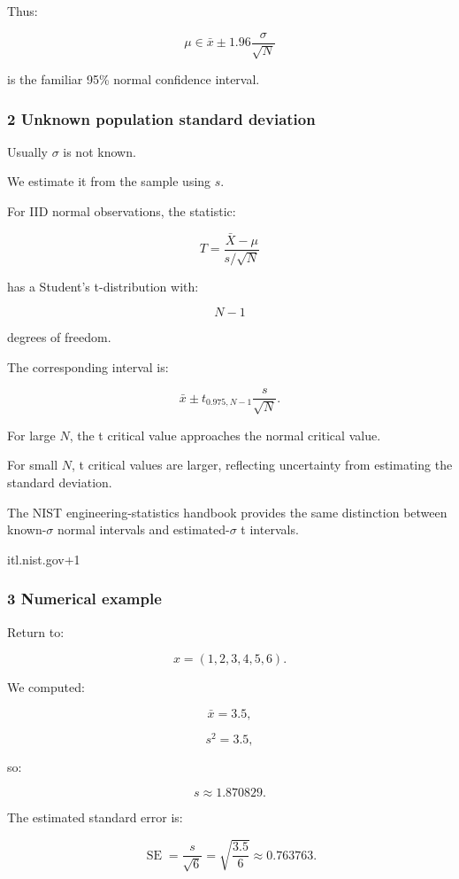 Thus:

\[
 \boxed{ \mu\in \bar x\pm1.96\frac{\sigma}{\sqrt N} }
\]

is the familiar 95\% normal confidence interval.

\subsubsection{2 Unknown population standard deviation}\label{02-foundations-ii-ch030-unknown-population-standard-deviation}

Usually \(\sigma\) is not known.

We estimate it from the sample using \(s\).

For IID normal observations, the statistic:

\[
 \boxed{ T= \frac{\bar X-\mu}{s/\sqrt N} }
\]

has a Student's t-distribution with:

\[
 N-1
\]

degrees of freedom.

The corresponding interval is:

\[
 \boxed{ \bar x \pm t_{0.975,N-1}\frac{s}{\sqrt N} }.
\]

For large \(N\), the t critical value approaches the normal critical value.

For small \(N\), t critical values are larger, reflecting uncertainty from estimating the standard deviation.

The NIST engineering-statistics handbook provides the same distinction between known-\(\sigma\) normal intervals and estimated-\(\sigma\) t intervals.

itl.nist.gov+1

\subsubsection{3 Numerical example}\label{02-foundations-ii-ch030-numerical-example}

Return to:

\[
 x=(1,2,3,4,5,6).
\]

We computed:

\[
 \bar x=3.5,
\]

\[
 s^2=3.5,
\]

so:

\[
 s\approx1.870829.
\]

The estimated standard error is:

\[
 \operatorname{SE}= \frac{s}{\sqrt6} = \sqrt{\frac{3.5}{6}} \approx0.763763.
\]

